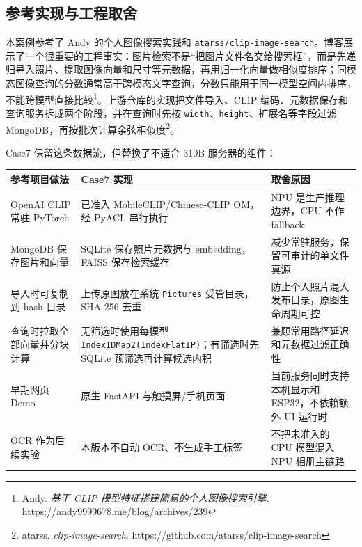 \subsection{参考实现与工程取舍}\label{ux53c2ux8003ux5b9eux73b0ux4e0eux5de5ux7a0bux53d6ux820d}

本案例参考了 Andy 的个人图像搜索实践和
\passthrough{\lstinline!atarss/clip-image-search!}。博客展示了一个很重要的工程事实：图片检索不是``把图片文件名交给搜索框''，而是先递归导入照片、提取图像向量和尺寸等元数据，再用归一化向量做相似度排序；同模态图像查询的分数通常高于跨模态文字查询，分数只能用于同一模型空间内排序，不能跨模型直接比较\footnote{Andy.
  \emph{基于 CLIP 模型特征搭建简易的个人图像搜索引擎}.
  https://andy9999678.me/blog/archives/239}。上游仓库的实现把文件导入、CLIP
编码、元数据保存和查询服务拆成两个阶段，并在查询时先按
\passthrough{\lstinline!width!}、\passthrough{\lstinline!height!}、扩展名等字段过滤
MongoDB，再按批次计算余弦相似度\footnote{atarss.
  \emph{clip-image-search}. https://github.com/atarss/clip-image-search}。

Case7 保留这条数据流，但替换了不适合 310B 服务器的组件：

\begin{longtable}[]{@{}
  >{\raggedright\arraybackslash}p{}
  >{\raggedright\arraybackslash}p{}
  >{\raggedright\arraybackslash}p{}@{}}
\toprule\noalign{}
\begin{minipage}[b]{\linewidth}\raggedright
参考项目做法
\end{minipage} & \begin{minipage}[b]{\linewidth}\raggedright
Case7 实现
\end{minipage} & \begin{minipage}[b]{\linewidth}\raggedright
取舍原因
\end{minipage} \\
\midrule\noalign{}
\endhead
\bottomrule\noalign{}
\endlastfoot
OpenAI CLIP 常驻 PyTorch & 已准入 MobileCLIP/Chinese-CLIP OM，经 PyACL
串行执行 & NPU 是生产推理边界，CPU 不作 fallback \\
MongoDB 保存图片和向量 & SQLite 保存照片元数据与 embedding，FAISS
保存检索缓存 & 减少常驻服务，保留可审计的单文件真源 \\
导入时可复制到 hash 目录 & 上传原图放在系统
\passthrough{\lstinline!Pictures!} 受管目录，SHA-256 去重 &
防止个人照片混入发布目录，原图生命周期可控 \\
查询时拉取全部向量并分块计算 & 无筛选时使用每模型
\passthrough{\lstinline!IndexIDMap2(IndexFlatIP)!}；有筛选时先 SQLite
预筛选再计算候选内积 & 兼顾常用路径延迟和元数据过滤正确性 \\
早期网页 Demo & 原生 FastAPI 与触摸屏/手机页面 &
当前服务同时支持本机显示和 ESP32，不依赖额外 UI 运行时 \\
OCR 作为后续实验 & 本版本不自动 OCR、不生成手工标签 & 不把未准入的 CPU
模型混入 NPU 相册主链路 \\
\end{longtable}

